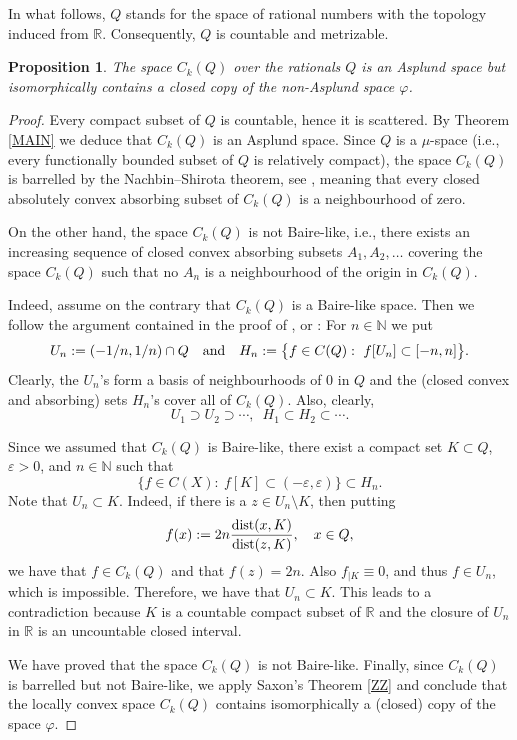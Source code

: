 \documentclass[12pt]{amsart}
\theoremstyle{plain}
\newtheorem{proposition}[theorem]{Proposition}
\theoremstyle{definition}
\theoremstyle{remark}
\def\N{{\mathbb N}}
\def\R{{\mathbb R}}
\begin{document}
In what follows, $Q$ stands for the space of rational numbers with the topology induced from $\mathbb{R}$. Consequently, $Q$ is countable and metrizable.
\begin{proposition} \cite{Kakol-Leiderman} \label{UU}
The space $C_k(Q)$ over the rationals $Q$ is an Asplund space but isomorphically contains a closed copy of the non-Asplund space $\varphi$.
\end{proposition}
\begin{proof}
Every compact subset of $Q$ is countable, hence it is scattered. By Theorem \ref{MAIN} we deduce that $C_k(Q)$ is an Asplund space. Since $Q$ is a $\mu$-space (i.e., every functionally bounded subset of $Q$ is relatively compact), the space $C_k(Q)$ is barrelled by the Nachbin--Shirota theorem, see \cite[Propostion 2.4.16]{KKPS}, meaning that every closed absolutely convex absorbing subset of $C_k(Q)$ is a neighbourhood of zero.

On the other hand, the space $C_k(Q)$ is not Baire-like, i.e., there exists an increasing sequence of closed convex absorbing subsets $A_1, A_2,\ldots$ covering the space $C_k(Q)$ such that no $A_n$ is a neighbourhood of the origin in $C_k(Q)$.

Indeed, assume on the contrary that $C_k(Q)$ is a Baire-like space. Then we follow the argument contained in the proof of \cite[Proposition 2.4.20]{KKPS},
or \cite[Corollary 5.3.4]{mccoy}: For $n\in\N$ we put
$$
U_n:= (-1/n,1/n)\cap Q\quad {\rm and}\quad H_n:= \big\{f\in C(Q):\  f[U_n]\subset [-n,n]\big\}.
$$
Clearly, the $U_n$'s form a basis of neighbourhoods of $0$ in $Q$ and the (closed convex and absorbing) sets $H_n$'s cover all of $C_k(Q)$.
Also, clearly, $$U_1 \supset U_2\supset \cdots, \,\,\,H_1\subset H_2\subset \cdots.$$

Since we assumed that $C_{k}(Q)$ is Baire-like, there exist a compact
set $K\subset Q$, $\varepsilon>0$, and $n\in\N$ such that
$$
\{f\in C(X):\ f[K] \subset (-\varepsilon,\varepsilon)\}\subset H_{n}.
$$
Note that $U_{n}\subset K$. Indeed, if there is a $z\in U_{n}\setminus K$, then putting
$$
f(x):= 2n\frac{{\rm dist}(x,K)}{{\rm dist}(z,K)},\quad x\in Q,
$$
we have that $f\in C_k(Q)$ and that $f(z)=2n$. Also $f_{|K}\equiv 0$, and thus $f\in U_n$, which is impossible.
Therefore, we have that $U_{n}\subset K$. This leads to a contradiction because $K$ is a countable compact subset of $\R$ and the closure of $U_{n}$ in $\R$ is an uncountable closed interval.

We have proved that the space $C_k(Q)$ is not Baire-like.
Finally, since $C_k(Q)$ is barrelled but not Baire-like, we apply Saxon's Theorem \ref{ZZ}  and conclude that the locally convex space  $C_k(Q)$ contains isomorphically a (closed) copy of the space $\varphi$.
\end{proof}
\end{document}
